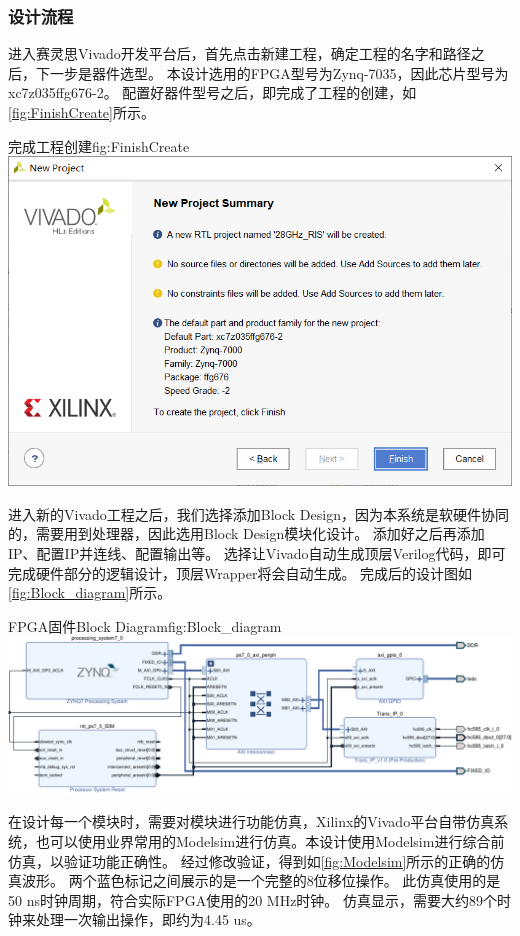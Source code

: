 \documentclass[supercite]{HustGraduPaper}
\begin{document}
\subsubsection{设计流程}

进入赛灵思Vivado开发平台后，首先点击新建工程，确定工程的名字和路径之后，下一步是器件选型。
本设计选用的FPGA型号为Zynq-7035，因此芯片型号为xc7z035ffg676-2。
配置好器件型号之后，即完成了工程的创建，如\autoref{fig:FinishCreate}所示。

\begin{generalfig}[htb]{完成工程创建}{fig:FinishCreate}
	\includegraphics[width=0.8\linewidth]{Figures/FinishCreate.png}
\end{generalfig}

进入新的Vivado工程之后，我们选择添加Block Design，因为本系统是软硬件协同的，需要用到处理器，因此选用Block Design模块化设计。
添加好之后再添加IP、配置IP并连线、配置输出等。
选择让Vivado自动生成顶层Verilog代码，即可完成硬件部分的逻辑设计，顶层Wrapper将会自动生成。
完成后的设计图如\autoref{fig:Block_diagram}所示。

\begin{generalfig}[htb]{FPGA固件Block Diagram}{fig:Block_diagram}
	\includegraphics[width=\linewidth]{Figures/Block_diagram.pdf}
\end{generalfig}

在设计每一个模块时，需要对模块进行功能仿真，Xilinx的Vivado平台自带仿真系统，也可以使用业界常用的Modelsim进行仿真。本设计使用Modelsim进行综合前仿真，以验证功能正确性。
经过修改验证，得到如\autoref{fig:Modelsim}所示的正确的仿真波形。
两个蓝色标记之间展示的是一个完整的8位移位操作。
此仿真使用的是50 ns时钟周期，符合实际FPGA使用的20 MHz时钟。
仿真显示，需要大约89个时钟来处理一次输出操作，即约为4.45 us。
\end{document}
